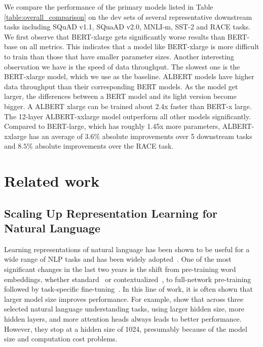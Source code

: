 We compare the performance of the primary models listed in Table \ref{table:overall_comparison} on the dev sets of several representative downstream tasks including SQuAD v1.1, SQuaAD v2.0, MNLI-m, SST-2 and RACE tasks. We first observe that BERT-xlarge gets significantly worse results than BERT-base on all metrics. This indicates that a model like BERT-xlarge is more difficult to train than those that have smaller parameter sizes. 
Another interesting observation we have is the speed of data throughput. The slowest one is the BERT-xlarge model, which we use as the baseline. ALBERT models have higher data throughput than their corresponding BERT models. As the model get larger, the differences between a BERT model and its light version become bigger. A ALBERT xlarge can be trained about 2.4x faster than BERT-x large. The 12-layer ALBERT-xxlarge model outperform all other models significantly. Compared to BERT-large, which has roughly 1.45x more parameters, ALBERT-xxlarge has an average of $3.6\%$ absolute improvements over 5 downstream tasks and $8.5\%$ absolute improvements over the RACE task. 



\section{Related work}

\subsection{Scaling Up Representation Learning for Natural Language}
Learning representations of natural language has been shown to be useful for a wide range of NLP tasks and has been widely adopted~\citep{mikolov2013distributed,le-mikolov:2014,dai2015semi, peters2018deep,devlin2018bert,radford2018improving,radford2019language}.
One of the most significant changes in the last two years is the shift from pre-training word embeddings, whether standard~\citep{mikolov2013distributed,pennington-etal-2014-glove} or contextualized~\citep{NIPS2017_7209,peters2018deep}, to full-network pre-training followed by task-specific fine-tuning~\citep{dai2015semi, radford2018improving,devlin2018bert}.
In this line of work, it is often shown that larger model size improves performance.
For example, \cite{devlin2018bert} show that across three selected natural language understanding tasks, using larger hidden size, more hidden layers, and more attention heads always leads to better performance.
However, they stop at a hidden size of 1024, presumably because of the model size and computation cost problems. 

